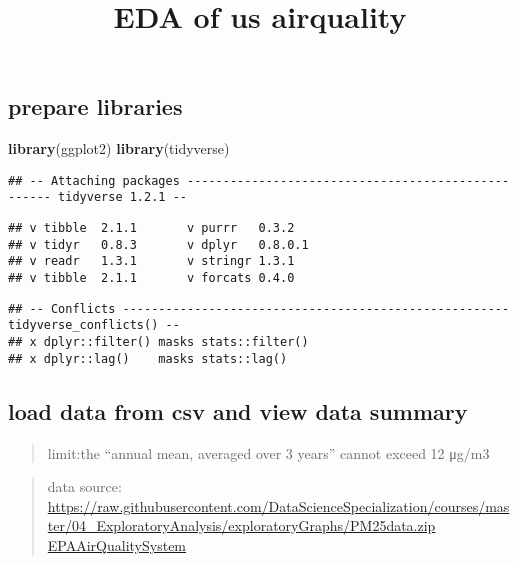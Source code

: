 \documentclass[]{article}
\title{EDA of us airquality}
\author{}
\date{}
\newenvironment{Shaded}{\begin{snugshade}}{\end{snugshade}}
\newcommand{\KeywordTok}[1]{\textcolor[rgb]{0.13,0.29,0.53}{\textbf{#1}}}
\newcommand{\NormalTok}[1]{#1}
\begin{document}
\maketitle

\subsection{prepare libraries}\label{prepare-libraries}

\begin{Shaded}
\begin{Highlighting}[]
\KeywordTok{library}\NormalTok{(ggplot2)}
\KeywordTok{library}\NormalTok{(tidyverse)}
\end{Highlighting}
\end{Shaded}

\begin{verbatim}
## -- Attaching packages --------------------------------------------------- tidyverse 1.2.1 --
\end{verbatim}

\begin{verbatim}
## v tibble  2.1.1       v purrr   0.3.2  
## v tidyr   0.8.3       v dplyr   0.8.0.1
## v readr   1.3.1       v stringr 1.3.1  
## v tibble  2.1.1       v forcats 0.4.0
\end{verbatim}

\begin{verbatim}
## -- Conflicts ------------------------------------------------------ tidyverse_conflicts() --
## x dplyr::filter() masks stats::filter()
## x dplyr::lag()    masks stats::lag()
\end{verbatim}

\subsection{load data from csv and view data
summary}\label{load-data-from-csv-and-view-data-summary}

\begin{quote}
limit:the ``annual mean, averaged over 3 years'' cannot exceed 12 μg/m3
\end{quote}

\begin{quote}
data source:
\url{https://raw.githubusercontent.com/DataScienceSpecialization/courses/master/04_ExploratoryAnalysis/exploratoryGraphs/PM25data.zip}
\href{https://www3.epa.gov/ttn/airs/airsaqs/detaildata/downloadaqsdata.htm}{EPAAirQualitySystem}
\end{quote}
\end{document}

